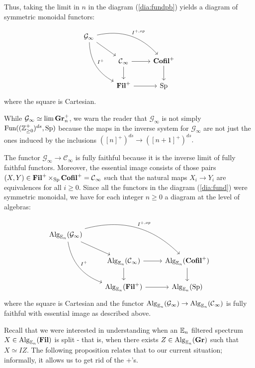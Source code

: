 Thus, taking the limit in $n$ in the diagram (\ref{dia:fundpb}) yields a diagram of symmetric monoidal functors:

\begin{equation}\label{dia:fund}
\begin{tikzcd}
\mathcal{G}_\infty
 \arrow[drr, bend left, "I^{+,op}"]
  \arrow[ddr, bend right, "I^+"]
  \arrow[dr] & & \\
&\C_\infty \arrow[r] \arrow[d]&  \Cofil^+ \arrow[d]\\
& \Fil^+ \arrow[r]& \Sp
\end{tikzcd}
\end{equation}
where the square is Cartesian.

\begin{rmk}
While $\mathcal{G}_\infty \simeq \lim \operatorname{\mathbf{Gr}}_n^{+}$, we warn the reader that $\mathcal{G}_\infty$ is not simply $\operatorname{\text{Fun}}((\operatorname{\mathbb{Z}}_{\geq 0}^+)^{ds}, \operatorname{\mathrm{Sp}})$ because the maps in the inverse system for $\mathcal{G}_\infty$ are not just the ones induced by the inclusions $([n]^+)^{ds} \to ([n+1]^+)^{ds}.$
\end{rmk}

The functor $\mathcal{G}_\infty \to \mathcal{C}_\infty$ is fully faithful because it is the inverse limit of fully faithful functors.  Moreover, the essential image consists of those pairs $(X,Y)\in \operatorname{\mathbf{Fil}}^+\times_{\operatorname{\mathrm{Sp}}} \operatorname{\mathbf{Cofil}}^+ = \operatorname{\mathcal{C}}_{\infty}$ such that the natural maps $X_i\to Y_i$ are equivalences for all $i\geq 0$.   Since all the functors in the diagram (\ref{dia:fund}) were symmetric monoidal, we have for each integer $n\geq 0$ a diagram at the level of algebras:

\begin{equation}\label{dia:fundmon}
\begin{tikzcd}
\Alg_{\E_n}(\mathcal{G}_\infty)
 \arrow[drr, bend left, "I^{+,op}"]
  \arrow[ddr, bend right, "I^+"]
  \arrow[dr] & & \\
&\Alg_{\E_n}(\C_\infty) \arrow[r] \arrow[d]&  \Alg_{\E_n}(\Cofil^+ )\arrow[d]\\
& \Alg_{\E_n}(\Fil^+ )\arrow[r]& \Alg_{\E_n}(\Sp)
\end{tikzcd}
\end{equation}
where the square is Cartesian and the functor $\operatorname{\mathrm{Alg}}_{\operatorname{\mathbb{E}}_n}(\mathcal{G}_\infty) \to \operatorname{\mathrm{Alg}}_{\operatorname{\mathbb{E}}_n}(\operatorname{\mathcal{C}}_\infty)$ is fully faithful with essential image as described above.  


Recall that we were interested in understanding when an $\operatorname{\mathbb{E}}_n$ filtered spectrum $X\in \operatorname{\mathrm{Alg}}_{\operatorname{\mathbb{E}}_n}(\operatorname{\mathbf{Fil}})$ is split - that is, when there exists $Z\in \operatorname{\mathrm{Alg}}_{\operatorname{\mathbb{E}}_n}(\operatorname{\mathbf{Gr}})$ such that $X \simeq IZ.$  The following proposition relates that to our current situation; informally, it allows us to get rid of the +'s.

